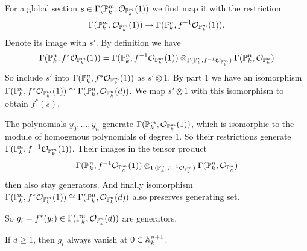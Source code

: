 \begin{exercise}{3}
\begin{enumerate}
{                For a global section $s \in \Gamma(\mathbb{P}^m_k,
                \mathcal{O}_{\mathbb{P}^m_k}(1))$ we first map it with the
                restriction
                \begin{equation*}
                    \Gamma(\mathbb{P}^m_k, \mathcal{O}_{\mathbb{P}^m_k}(1)) \to
                    \Gamma(\mathbb{P}^n_k, f^{-1} \mathcal{O}_{\mathbb{P}^m_k}(1)).
                \end{equation*}
                Denote its image with $s'$.
                By definition we have 
                \begin{equation*}
                    \Gamma(\mathbb{P}^n_k, f^* \mathcal{O}_{\mathbb{P}^m_k}(1)) =
                    \Gamma(\mathbb{P}^n_k, f^{-1} \mathcal{O}_{\mathbb{P}^m_k}(1))
                    \otimes_{\Gamma(\mathbb{P}^n_k, f^{-1} \mathcal{O}_{\mathbb{P}^m_k})}
                    \Gamma(\mathbb{P}^n_k, \mathcal{O}_{\mathbb{P}^n_k})
                \end{equation*}
                So include $s'$ into $\Gamma(\mathbb{P}^n_k, f^*
                \mathcal{O}_{\mathbb{P}^m_k}(1))$ as $s' \otimes 1$.
                By part $1$ we have an isomorphism $\Gamma(\mathbb{P}^n_k, f^*
                \mathcal{O}_{\mathbb{P}^m_k}(1)) \cong \Gamma(\mathbb{P}^n_k,
                \mathcal{O}_{\mathbb{P}^n_k}(d))$. We map $s' \otimes 1$ with this
                isomorphism to obtain $f^*(s)$.

                The polynomials $y_0, \dots, y_n$ generate $\Gamma(\mathbb{P}^m_k,
                \mathcal{O}_{\mathbb{P}^m_k}(1))$, which is isomorphic to the module
                of homogenous polynomials of degree $1$. So their restrictions
                generate $\Gamma(\mathbb{P}^n_k, f^{-1} \mathcal{O}_{\mathbb{P}^m_k}(1))$.
                Their images in the tensor product
                \begin{equation*}
                    \Gamma(\mathbb{P}^n_k, f^{-1} \mathcal{O}_{\mathbb{P}^m_k}(1))
                    \otimes_{\Gamma(\mathbb{P}^n_k, f^{-1} \mathcal{O}_{\mathbb{P}^m_k})}
                    \Gamma(\mathbb{P}^n_k, \mathcal{O}_{\mathbb{P}^n_k})
                \end{equation*}
                then also stay generators. And finally
                isomorphism $\Gamma(\mathbb{P}^n_k, f^* \mathcal{O}_{\mathbb{P}^m_k}(1))
                \cong \Gamma(\mathbb{P}^n_k, \mathcal{O}_{\mathbb{P}^n_k}(d))$ also
                preserves generating set.

                So $g_i = f^*(y_i) \in \Gamma(\mathbb{P}^n_k,
                \mathcal{O}_{\mathbb{P}^n_k}(d))$ are generators.

                If $d \geq 1$, then $g_i$ always vanish at $0 \in \mathbb{A}^{n+1}_k$.

}
\end{enumerate}
\end{exercise}
